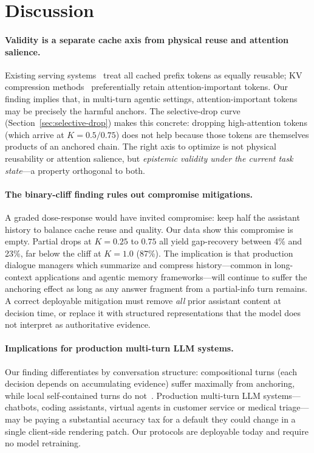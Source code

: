 \documentclass{article}
\begin{document}
\section{Discussion}
\label{sec:discussion}

\paragraph{Validity is a separate cache axis from physical reuse and attention salience.}
Existing serving systems~\citep{kwon2023vllm,zheng2024sglang,liu2025lmcache} treat all cached prefix tokens as equally reusable; KV compression methods~\citep{zhang2023h2o,xiao2024streamingllm,li2024snapkv} preferentially retain attention-important tokens. Our finding implies that, in multi-turn agentic settings, attention-important tokens may be precisely the harmful anchors. The selective-drop curve (Section~\ref{sec:selective-drop}) makes this concrete: dropping high-attention tokens (which arrive at $K=0.5/0.75$) does not help because those tokens are themselves products of an anchored chain. The right axis to optimize is not physical reusability or attention salience, but \emph{epistemic validity under the current task state}---a property orthogonal to both.

\paragraph{The binary-cliff finding rules out compromise mitigations.}
A graded dose-response would have invited compromise: keep half the assistant history to balance cache reuse and quality. Our data show this compromise is empty. Partial drops at $K=0.25$ to $0.75$ all yield gap-recovery between 4\% and 23\%, far below the cliff at $K=1.0$ (87\%). The implication is that production dialogue managers which summarize and compress history---common in long-context applications and agentic memory frameworks---will continue to suffer the anchoring effect as long as any answer fragment from a partial-info turn remains. A correct deployable mitigation must remove \emph{all} prior assistant content at decision time, or replace it with structured representations that the model does not interpret as authoritative evidence.

\paragraph{Implications for production multi-turn LLM systems.}
Our finding differentiates by conversation structure: compositional turns (each decision depends on accumulating evidence) suffer maximally from anchoring, while local self-contained turns do not~\citep{huang2026benefit}. Production multi-turn LLM systems---chatbots, coding assistants, virtual agents in customer service or medical triage---may be paying a substantial accuracy tax for a default they could change in a single client-side rendering patch. Our protocols are deployable today and require no model retraining.
\end{document}

